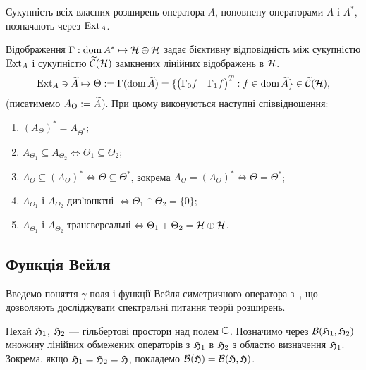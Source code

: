 \begin{definition}
	Сукупність всіх власних розширень оператора $A$, поповнену операторами $A$ і $A^*$, позначають через $\operatorname{Ext}_A$.
\end{definition}

\begin{proposition}
	Відображення $\Gamma:\operatorname{dom}{A^*}\mapsto \mathcal{H}\oplus\mathcal{H}$ задає бієктивну відповідність між сукупністю $\operatorname{Ext}_A$ і сукупністю $\widetilde{\mathcal{C}}(\mathcal{H})$ замкнених лінійних відображень в $\mathcal{H}$.
	\begin{equation}
		\operatorname{Ext}_A \ni \widetilde A \mapsto \Theta := \Gamma(\operatorname{dom} \widetilde A) = \{ 
		{\begin{pmatrix} \Gamma_0 f & \Gamma_1f	\end{pmatrix}}^T : f\in \operatorname{dom} \widetilde A \} \in \widetilde {\mathcal{C}}(\mathcal{H}), 	
	\end{equation}
	(писатимемо $A_\Theta := \widetilde A$). При цьому виконуються наступні співвідношення:
	\begin{enumerate}
		\item $(A_\Theta)^* = A_{\Theta^*}$;
		\item $A_{\Theta_1} \subseteq A_{\Theta_2} \Leftrightarrow \Theta_1 \subseteq \Theta_2$;
		\item $A_{\Theta} \subseteq (A_{\Theta})^* \Leftrightarrow \Theta \subseteq \Theta^*$, зокрема $A_\Theta = (A_\Theta)^* \Leftrightarrow \Theta = \Theta^*$;
		\item $A_{\Theta_1}$ і $A_{\Theta_2}$ диз'юнктні $\Leftrightarrow \Theta_1 \cap \Theta_2 = \{0\}$;
		\item $A_{\Theta_1}$ і $A_{\Theta_2}$ трансверсальні $\Leftrightarrow \Theta_1 + \Theta_2 = \mathcal{H}\oplus\mathcal{H}$.
	\end{enumerate}
\end{proposition}

\subsection{Функція Вейля}

Введемо поняття $\gamma$-поля і функції Вейля симетричного оператора з~\cite{DerMal2017}, що дозволяють досліджувати спектральні питання теорії розширень.

\begin{definition}
	Нехай $\mathfrak{H}_1$, $\mathfrak{H}_2$ --- гільбертові простори над полем $\mathbb{C}$. Позначимо через $\mathcal{B}(\mathfrak{H}_1,\mathfrak{H}_2)$ множину лінійних обмежених операторів з $\mathfrak{H}_1$ в $\mathfrak{H}_2$ з областю визначення $\mathfrak{H}_1$. Зокрема, якщо $\mathfrak{H}_1=\mathfrak{H}_2=\mathfrak{H}$, покладемо $\mathcal{B}(\mathfrak{H})=\mathcal{B}(\mathfrak{H},\mathfrak{H})$.
\end{definition}

